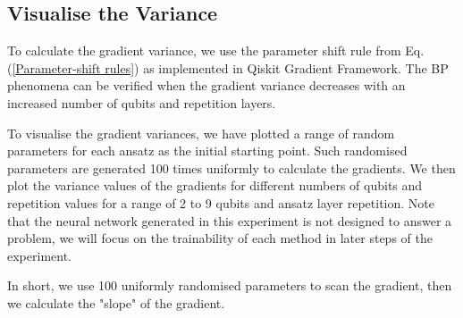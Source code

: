 \subsection{Visualise the Variance}
To calculate the gradient variance, we use the parameter shift rule from Eq. (\ref{Parameter-shift rules}) as implemented in Qiskit Gradient Framework.
The BP phenomena can be verified when the gradient variance decreases with an increased number of qubits and repetition layers.

To visualise the gradient variances, we have plotted a range of random parameters for each ansatz as the initial starting point.
Such randomised parameters are generated 100 times uniformly to calculate the gradients.
We then plot the variance values of the gradients for different numbers of qubits and repetition values for a range of 2 to 9 qubits and ansatz layer repetition.
Note that the neural network generated in this experiment is not designed to answer a problem, we will focus on the trainability of each method in later steps of the experiment.

In short, we use 100 uniformly randomised parameters to scan the gradient, then we calculate the "slope" of the gradient.